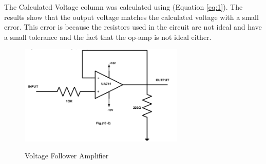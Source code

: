 \documentclass[12pt]{article}
\begin{document}
\begin{table}[H]
    \centering
    \caption{Inverting Adder Amplifier Voltages}
    \label{tab:1}
\end{table}
The Calculated Voltage column was calculated using (Equation \ref{eq:1}). The results show that the output voltage matches the calculated voltage with a small error. This error is because the resistors used in the circuit are not ideal and have a small tolerance and the fact that the op-amp is not ideal either.
\begin{figure}[H]
    \centering
    \includegraphics[width=0.7\textwidth]{assets//main/2023-08-27-18-59-49.png}
    \caption{Voltage Follower Amplifier}
    \label{fig:2}
    \cite{manual}
\end{figure}
\end{document}
